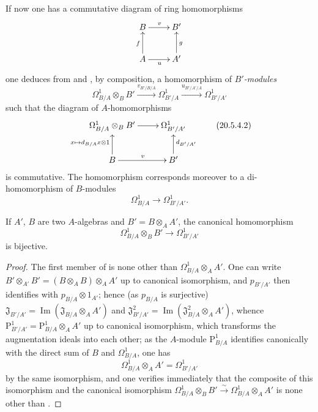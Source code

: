 \begin{env}[20.5.4]
\label{0.20.5.4}
If now one has a commutative diagram of ring homomorphisms
\[
\xymatrix{
  B \ar[r]^v & B' \\
  A \ar[u]^f \ar[r]_u & A' \ar[u]_g
}
\]
one deduces from  and , by composition, a homomorphism of \emph{$B'$-modules}
\begin{equation}
\tag{20.5.4.1}
  \label{0.20.5.4.1}
  \Omega^1_{B/A}\otimes_B B'\xrightarrow{v_{B'/B/A}}\Omega^1_{B'/A}\xrightarrow{u_{B'/A'/A}}\Omega^1_{B'/A'}
\end{equation}
such that the diagram of $A$-homomorphisms
\[
\xymatrix{
  \Omega^1_{B/A}\otimes_B B' \ar[r] & \Omega^1_{B'/A'} \\
  B \ar[u]^{x\mapsto d_{B/A}x\otimes 1} \ar[r]^v & B' \ar[u]_{d_{B'/A'}}
}
\tag{20.5.4.2}
  \label{0.20.5.4.2}
\]
is commutative.
The homomorphism  corresponds moreover to a di-homomorphism of $B$-modules
\begin{equation}
\tag{20.5.4.3}
  \label{0.20.5.4.3}
  \Omega^1_{B/A}\to\Omega^1_{B'/A'}.
\end{equation}
\end{env}

\begin{proposition}[20.5.5]
\label{0.20.5.5}
If $A'$, $B$ are two $A$-algebras and $B'=B\otimes_A A'$, the canonical homomorphism 
\begin{equation}
\tag{20.5.5.1}
  \label{0.20.5.5.1}
  \Omega^1_{B/A}\otimes_B B'\to\Omega^1_{B'/A'}
\end{equation}
is bijective.
\end{proposition}

\begin{proof}
The first member of  is none other than $\Omega^1_{B/A}\otimes_A A'$.
One can write $B'\otimes_{A'}B'=(B\otimes_A B)\otimes_A A'$ up to canonical isomorphism, and $p_{B'/A'}$ then identifies with $p_{B/A}\otimes1_{A'}$; hence (as $p_{B/A}$ is surjective) $\mathfrak{J}_{B'/A'}=\operatorname{Im}(\mathfrak{J}_{B/A}\otimes_A A')$ and $\mathfrak{J}^2_{B'/A'}=\operatorname{Im}(\mathfrak{J}^2_{B/A}\otimes_A A')$, whence $\mathrm{P}^1_{B'/A'}=\mathrm{P}^1_{B/A}\otimes_A A'$ up to canonical isomorphism, which transforms the augmentation ideals into each other; as the $A$-module $\mathrm{P}^1_{B/A}$ identifies canonically with the direct sum of $B$ and $\Omega^1_{B/A}$, one has
\begin{equation}
\tag{20.5.5.2}
  \label{0.20.5.5.2}
  \Omega^1_{B/A}\otimes_A A' = \Omega^1_{B'/A'}
\end{equation}
by the same isomorphism, and one verifies immediately that the composite of this isomorphism and the canonical isomorphism $\Omega^1_{B/A}\otimes_B B'\xrightarrow{\sim}\Omega^1_{B/A}\otimes_A A'$ is none other than .
\end{proof}

